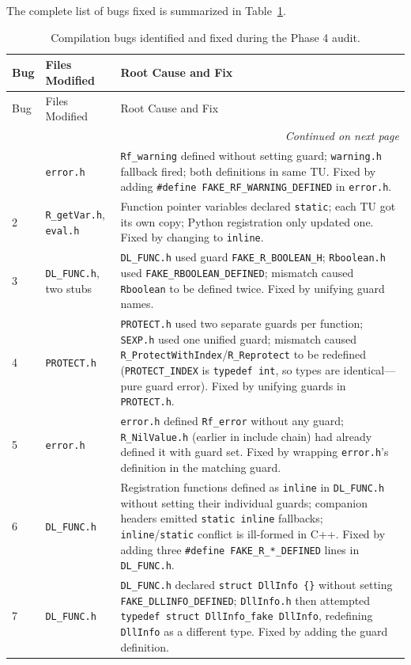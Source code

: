 \documentclass[12pt]{article}
\begin{document}
The complete list of bugs fixed is summarized in Table~\ref{tab:phase4bugs}.

\begin{longtable}{lp{4cm}p{6cm}}
\caption{Compilation bugs identified and fixed during the Phase 4 audit.\label{tab:phase4bugs}} \\
\toprule
Bug & Files Modified & Root Cause and Fix \\
\midrule
\endfirsthead
\toprule
Bug & Files Modified & Root Cause and Fix \\
\midrule
\endhead
\midrule
\multicolumn{3}{r}{\textit{Continued on next page}} \\
\endfoot
\bottomrule
\endlastfoot
1 & \texttt{error.h} & \texttt{Rf\_warning} defined without setting guard; \texttt{warning.h} fallback fired; both definitions in same TU. Fixed by adding \texttt{\#define FAKE\_RF\_WARNING\_DEFINED} in \texttt{error.h}. \\
2 & \texttt{R\_getVar.h}, \texttt{eval.h} & Function pointer variables declared \texttt{static}; each TU got its own copy; Python registration only updated one. Fixed by changing to \texttt{inline}. \\
3 & \texttt{DL\_FUNC.h}, two stubs & \texttt{DL\_FUNC.h} used guard \texttt{FAKE\_R\_BOOLEAN\_H}; \texttt{Rboolean.h} used \texttt{FAKE\_RBOOLEAN\_DEFINED}; mismatch caused \texttt{Rboolean} to be defined twice. Fixed by unifying guard names. \\
4 & \texttt{PROTECT.h} & \texttt{PROTECT.h} used two separate guards per function; \texttt{SEXP.h} used one unified guard; mismatch caused \texttt{R\_ProtectWithIndex}/\texttt{R\_Reprotect} to be redefined (\texttt{PROTECT\_INDEX} is \texttt{typedef int}, so types are identical---pure guard error). Fixed by unifying guards in \texttt{PROTECT.h}. \\
5 & \texttt{error.h} & \texttt{error.h} defined \texttt{Rf\_error} without any guard; \texttt{R\_NilValue.h} (earlier in include chain) had already defined it with guard set. Fixed by wrapping \texttt{error.h}'s definition in the matching guard. \\
6 & \texttt{DL\_FUNC.h} & Registration functions defined as \texttt{inline} in \texttt{DL\_FUNC.h} without setting their individual guards; companion headers emitted \texttt{static inline} fallbacks; \texttt{inline}/\texttt{static} conflict is ill-formed in C++. Fixed by adding three \texttt{\#define FAKE\_R\_*\_DEFINED} lines in \texttt{DL\_FUNC.h}. \\
7 & \texttt{DL\_FUNC.h} & \texttt{DL\_FUNC.h} declared \texttt{struct DllInfo \{\}} without setting \texttt{FAKE\_DLLINFO\_DEFINED}; \texttt{DllInfo.h} then attempted \texttt{typedef struct DllInfo\_fake DllInfo}, redefining \texttt{DllInfo} as a different type. Fixed by adding the guard definition. \\
\end{longtable}
\end{document}
